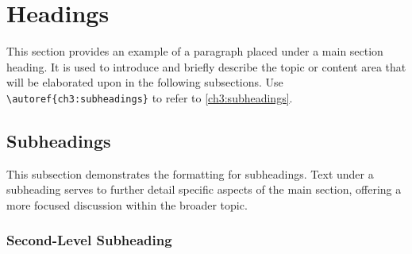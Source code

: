 


\section{Headings}
\label{ch3:headings}

\begin{paragraph}
This section provides an example of a paragraph placed under a main section heading. It is used to introduce and briefly describe the topic 
or content area that will be elaborated upon in the following subsections. Use \verb|\autoref{ch3:subheadings}| to refer to \autoref{ch3:subheadings}.
\end{paragraph}

\subsection{Subheadings}
\label{ch3:subheadings}

\begin{subparagraph}
This subsection demonstrates the formatting for subheadings. Text under a subheading serves to further detail specific aspects of the main section, offering a more focused discussion within the broader topic.
\end{subparagraph}

\subsubsection{Second-Level Subheading}
\label{ch3:subsub:example}

